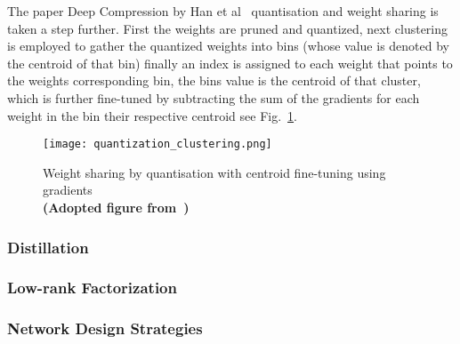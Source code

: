 \documentclass[../../D1.tex]{subfiles}
\begin{document}
The paper Deep Compression by Han et al~\autocite{hanDeepCompressionCompressing2016} quantisation and weight sharing is taken a step further.
First the weights are pruned and quantized, next clustering is employed to gather the quantized weights into bins (whose value is denoted by the centroid of that bin) finally an index is assigned to each weight that points to the weights corresponding bin, the bins value is the centroid of that cluster, which is further fine-tuned by subtracting the sum of the gradients for each weight in the bin their respective centroid see Fig.~\ref{fig:QuantisationClust}.  

\begin{figure}[H]
    \begin{center}
        \texttt{[image: quantization\_clustering.png]} 
    \end{center}
    
    \caption{Weight sharing by quantisation with centroid fine-tuning using gradients\\ \textbf{(Adopted figure from~\autocite{hanDeepCompressionCompressing2016})}}
    \label{fig:QuantisationClust}   
\end{figure}



\subsubsection{Distillation}\label{sec:Distillation}



\subsubsection{Low-rank Factorization}\label{sec:lrFactorization}

\subsubsection{Network Design Strategies}\label{sec:NetworkDesignStrat}
\end{document}
